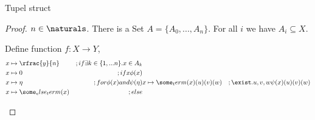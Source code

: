 

Tupel struct

\newtheorem{struct2}[theoremcount]{Struct2}

\begin{theorem}
\end{theorem}
\begin{proof}

    $n \in \naturals$.
    There is a Set $A = \{A_{0}, ..., A_{n}\}$.
    For all $i$ we have $A_{i} \subseteq X$.

    Define function $f: X \to Y$,
    \begin{align}
        &x \mapsto \rfrac{y}{n} &; if \exists k \in \{1, ... n\}. x \in A_{k} \\
        &x \mapsto 0 &; if x  \phi(x) \\ 

        &x \mapsto \eta &; for \phi(x) and \psi(\eta) 

        &x \mapsto \some_term(x)(u)(v)(w) &; \exist.u,v,w \psi(x)(u)(v)(w) \\ 

        &x \mapsto \some_else_term(x)   &; else 


    \end{align}
    \begin{proof_well_defined}
    \end{proof_well_defined}




\end{proof}




